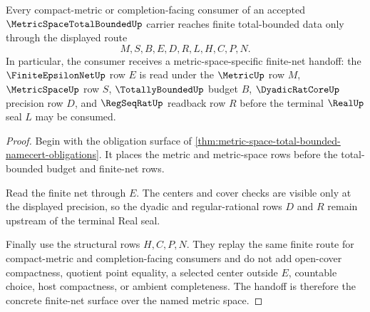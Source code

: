 \begin{theorem}
\label{thm:metric-space-total-bounded-finite-net-handoff}
Every compact-metric or completion-facing consumer of an accepted $\MetricSpaceTotalBoundedUp$ carrier reaches finite total-bounded data only through the displayed route
$$
M,S,B,E,D,R,L,H,C,P,N .
$$
In particular, the consumer receives a metric-space-specific finite-net handoff: the $\FiniteEpsilonNetUp$ row $E$ is read under the $\MetricUp$ row $M$, $\MetricSpaceUp$ row $S$, $\TotallyBoundedUp$ budget $B$, $\DyadicRatCoreUp$ precision row $D$, and $\RegSeqRatUp$ readback row $R$ before the terminal $\RealUp$ seal $L$ may be consumed.
\end{theorem}
\begin{proof}
Begin with the obligation surface of \autoref{thm:metric-space-total-bounded-namecert-obligations}. It places the metric and metric-space rows before the total-bounded budget and finite-net rows.

Read the finite net through $E$. The centers and cover checks are visible only at the displayed precision, so the dyadic and regular-rational rows $D$ and $R$ remain upstream of the terminal Real seal.

Finally use the structural rows $H,C,P,N$. They replay the same finite route for compact-metric and completion-facing consumers and do not add open-cover compactness, quotient point equality, a selected center outside $E$, countable choice, host compactness, or ambient completeness. The handoff is therefore the concrete finite-net surface over the named metric space.
\end{proof}



